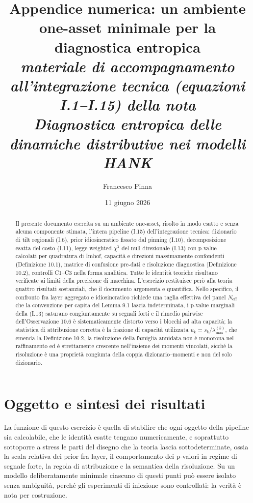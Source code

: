 \documentclass[11pt,a4paper]{article}
\title{\large\bfseries Appendice numerica: un ambiente one-asset minimale per la diagnostica entropica\\[2pt]
\normalsize\itshape materiale di accompagnamento all'integrazione tecnica (equazioni I.1--I.15) della nota\\ \emph{Diagnostica entropica delle dinamiche distributive nei modelli HANK}}
\author{\normalsize Francesco Pinna}
\date{\normalsize 11 giugno 2026}
\newcommand{\Neff}{N_{\mathrm{eff}}}
\begin{document}
\maketitle

\begin{abstract}
\noindent Il presente documento esercita su un ambiente one-asset, risolto in modo esatto e senza alcuna componente stimata, l'intera pipeline (I.15) dell'integrazione tecnica: dizionario di tilt regionali (I.6), prior idiosincratico fissato dal pinning (I.10), decomposizione esatta del costo (I.11), legge weighted-$\chi^2$ del null direzionale (I.13) con p-value calcolati per quadratura di Imhof, capacit\`a e direzioni massimamente confondenti (Definizione 10.1), matrice di confusione pre-dati e risoluzione diagnostica (Definizione 10.2), controlli C1--C3 nella forma analitica. Tutte le identit\`a teoriche risultano verificate ai limiti della precisione di macchina. L'esercizio restituisce per\`o alla teoria quattro risultati sostanziali, che il documento argomenta e quantifica. Nello specifico, il confronto fra layer aggregato e idiosincratico richiede una taglia effettiva del panel $\Neff$ che la convenzione per capita del Lemma 9.1 lascia indeterminata, i p-value marginali della (I.13) saturano congiuntamente su segnali forti e il rimedio pairwise dell'Osservazione 10.6 \`e sistematicamente distorto verso i blocchi ad alta capacit\`a; la statistica di attribuzione corretta \`e la frazione di capacit\`a utilizzata $u_k=s_k/\lambda_{\max}^{(k)}$, che emenda la Definizione 10.2, la risoluzione della famiglia annidata non \`e monotona nel raffinamento ed \`e strettamente crescente nell'insieme dei momenti vincolati, sicch\'e la risoluzione \`e una propriet\`a congiunta della coppia dizionario--momenti e non del solo dizionario.
\end{abstract}

\section{Oggetto e sintesi dei risultati}
La funzione di questo esercizio è quella di stabilire che ogni oggetto della pipeline sia calcolabile, che le identit\`a esatte tengano numericamente, e soprattutto sottoporre a stress le parti del disegno che la teoria lascia sottodeterminate, ossia la scala relativa dei prior fra layer, il comportamento dei p-valori in regime di segnale forte, la regola di attribuzione e la semantica della risoluzione. Su un modello deliberatamente minimale ciascuno di questi punti pu\`o essere isolato senza ambiguit\`a, perch\'e gli esperimenti di iniezione sono controllati: la verit\`a \`e nota per costruzione.
\end{document}
